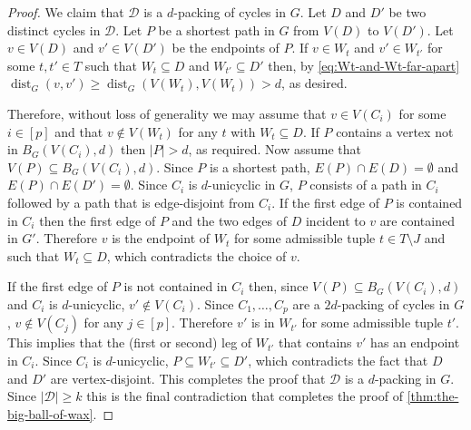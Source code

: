 \documentclass{patmorin}
\DeclareMathOperator{\dist}{dist}
\begin{document}
\begin{proof}
We claim that $\mathcal{D}$ is a $d$-packing of cycles in $G$. 
Let $D$ and $D'$ be two distinct cycles in $\mathcal{D}$.  Let $P$ be a shortest path in $G$ from $V(D)$ to $V(D')$.  Let $v\in V(D)$ and $v'\in V(D')$ be the endpoints of $P$.  If $v\in W_t$ and $v'\in W_{t'}$ for some $t,t'\in T$ such that $W_t\subseteq D$ and $W_{t'}\subseteq D'$ then, by \eqref{eq:Wt-and-Wt-far-apart} $\dist_G(v,v')\ge \dist_G(V(W_t),V(W_t))>d$, as desired.  

Therefore, without loss of generality we may assume that $v\in V(C_i)$ for some $i\in[p]$ and that $v\notin V(W_t)$ for any $t$ with $W_t\subseteq D$.  If $P$ contains a vertex not in $B_G(V(C_i),d)$ then $|P|>d$, as required.  Now assume that $V(P)\subseteq B_G(V(C_i),d)$. Since $P$ is a shortest path, $E(P)\cap E(D)=\emptyset$ and $E(P)\cap E(D')=\emptyset$.  Since $C_i$ is $d$-unicyclic in $G$, $P$ consists of a path in $C_i$ followed by a path that is edge-disjoint from $C_i$. If the first edge of $P$ is contained in $C_i$ then the first edge of $P$ and the two edges of $D$ incident to $v$ are contained in $G'$.  Therefore $v$ is the endpoint of $W_t$ for some admissible tuple $t\in T\setminus J$ and such that $W_t\subseteq D$, which contradicts the choice of $v$.


If the first edge of $P$ is not contained in $C_i$ then, since $V(P)\subseteq B_G(V(C_i),d)$ and $C_i$ is $d$-unicyclic, $v'\not\in V(C_i)$.  Since $C_1,\ldots,C_p$ are a $2d$-packing of cycles in $G$, $v\not\in V(C_j)$ for any $j\in[p]$. Therefore $v'$ is in $W_{t'}$ for some admissible tuple $t'$.  This implies that the (first or second) leg of $W_{t'}$ that contains $v'$ has an endpoint in $C_i$.  Since $C_i$ is $d$-unicyclic, $P\subseteq W_{t'}\subseteq D'$, which contradicts the fact that $D$ and $D'$ are vertex-disjoint.
This completes the proof that $\mathcal{D}$ is a $d$-packing in $G$. 
Since $|\mathcal{D}|\geq k$ this is the final contradiction that completes the proof of \cref{thm:the-big-ball-of-wax}.
\end{proof}



\end{document}
